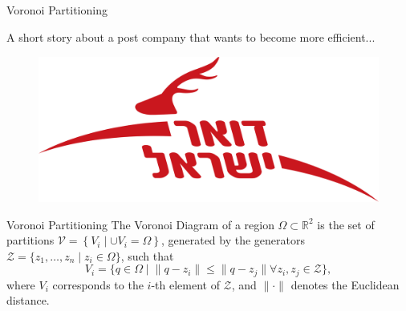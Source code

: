 \documentclass[t]{beamer}
\newcommand{\rsqr}{\mathbb{R}^2}
\begin{document}
\subsection[Voronoi Partitioning]{}
\begin{frame}[label=vorpart1]{Voronoi Partitioning}
\begin{center}
A short story about a post company that wants to become more efficient...
\end{center}
\begin{figure}
\centering
\includegraphics[scale=0.1]{background/israelpost-logo.png}
\end{figure}
\end{frame}
\begin{frame}[label=vorpart2]{Voronoi Partitioning}
The Voronoi Diagram of a region $\Omega \subset \rsqr$ is the set of partitions $\mathcal{V} = \left\{V_{i} \mid \cup V_{i} = \Omega\right\}$, generated by the generators $\mathcal{Z} = \{z_1,\ldots,z_n\mid z_{i} \in \Omega\}$, such that
\begin{equation*} \label{Voronoi Definition}
V_{i} = \{q\in\Omega \mid \lVert q - z_i \rVert \leq \lVert q - z_j \rVert \forall z_i,z_j\in\mathcal{Z}\},
\end{equation*}
where $V_{i}$ corresponds to the $i$-th element of $\mathcal{Z}$, and $\lVert \cdot \rVert$ denotes the Euclidean distance.
\end{frame}
\end{document}
